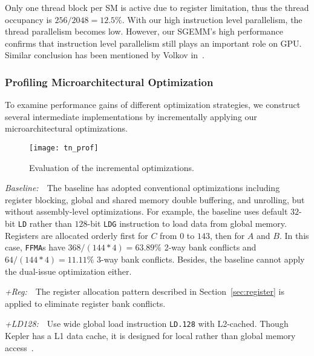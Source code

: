 
Only one thread block per SM is active due to register limitation, thus the thread occupancy is $256/2048=12.5\%$.
With our high instruction level parallelism, the thread parallelism becomes low.
However, our SGEMM's high performance confirms that instruction level parallelism still plays an important role on GPU.
Similar conclusion has been mentioned by Volkov in~\cite{volkov2010better}.

\subsubsection{Profiling Microarchitectural Optimization}

To examine performance gains of different optimization strategies, we construct several intermediate 
implementations by incrementally applying our microarchitectural optimizations.
\begin{figure}[htbp]
\begin{center}
\texttt{[image: tn\_prof]}
    \caption{\small Evaluation of the incremental optimizations.}
\label{fig:th_prof}
\end{center}
\end{figure}

{\it Baseline:}~~The baseline has adopted conventional optimizations including register blocking, global and shared memory double buffering, and unrolling, but without assembly-level optimizations.
For example, the baseline uses default $32$-bit {\tt LD} rather than $128$-bit {\tt LDG} instruction to load data from global memory.
Registers are allocated orderly first for $C$ from $0$ to $143$, then for $A$ and $B$. 
In this case, {\tt FFMA}s have $368/(144*4)=63.89\%$ 2-way bank conflicts and $64/(144*4)=11.11\%$ 3-way bank conflicts. 
Besides, the baseline cannot apply the dual-issue optimization either.

{\it +Reg:}~~The register allocation pattern described in Section~\ref{sec:register} is applied to eliminate register bank conflicts. 

{\it +LD128:}~~Use wide global load instruction {\tt LD.128} with L2-cached.
Though Kepler has a L1 data cache, it is designed for local rather than global memory access~\cite{gk110}.

